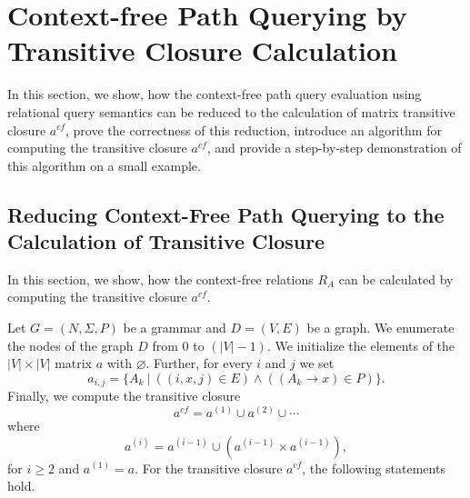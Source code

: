 \section{Context-free Path Querying by Transitive Closure Calculation}
\label{section_main}

In this section, we show, how the context-free path query evaluation using relational query semantics can be reduced to the calculation of matrix transitive closure $a^{cf}$, prove the correctness of this reduction, introduce an algorithm for computing the transitive closure $a^{cf}$, and provide a step-by-step demonstration of this algorithm on a small example.

\subsection{Reducing Context-Free Path Querying to the Calculation of Transitive Closure} \label{section_reducing}

In this section, we show, how the context-free relations $R_A$ can be calculated by computing the transitive closure $a^{cf}$.

Let $G = (N,\Sigma,P)$ be a grammar and $D = (V, E)$ be a graph. We enumerate the nodes of the graph $D$ from 0 to $(|V| - 1)$. We initialize the elements of the $|V| \times |V|$ matrix $a$ with $\varnothing$. Further, for every $i$ and $j$ we set $$a_{i,j} = \{A_k~|~((i,x,j) \in E) \wedge ((A_k \rightarrow x) \in P)\}.$$ Finally, we compute the transitive closure $$a^{cf} = a^{(1)} \cup a^{(2)} \cup \cdots$$ where $$a^{(i)} = a^{(i-1)} \cup (a^{(i-1)} \times a^{(i-1)}),$$ for $i \ge 2$ and $a^{(1)} = a$. For the transitive closure $a^{cf}$, the following statements hold.

